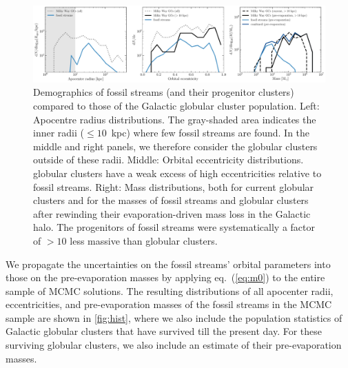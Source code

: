 \documentclass[twocolumn]{aastex63}
\begin{document}
\begin{figure}
\includegraphics[width=\hsize]{figures/distributions_mc.pdf}%
\caption{
\label{fig:hist}
Demographics of fossil streams (and their progenitor clusters) compared to those of the Galactic globular cluster population. Left: Apocentre radius distributions. The gray-shaded area indicates the inner radii ($\leq10$~kpc) where few fossil streams are found. In the middle and right panels, we therefore consider the globular clusters outside of these radii. Middle: Orbital eccentricity distributions. globular clusters have a weak excess of high eccentricities relative to fossil streams. Right: Mass distributions, both for current globular clusters and for the masses of fossil streams and globular clusters after rewinding their evaporation-driven mass loss in the Galactic halo. The progenitors of fossil streams were systematically a factor of $>10$ less massive than globular clusters.}
\end{figure}	
We propagate the uncertainties on the fossil streams' orbital parameters into those on the pre-evaporation masses by applying eq.~(\ref{eq:m0}) to the entire sample of MCMC solutions. The resulting distributions of all apocenter radii, eccentricities, and pre-evaporation masses of the fossil streams in the MCMC sample are shown in \autoref{fig:hist}, where we also include the population statistics of Galactic globular clusters that have survived till the present day. For these surviving globular clusters, we also include an estimate of their pre-evaporation masses.
\end{document}
